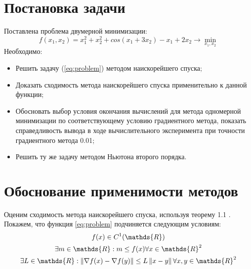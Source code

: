 \documentclass[main.tex]{subfiles}
\begin{document}
	
\section{Постановка задачи}
Поставлена проблема двумерной минимизации:
\begin{equation}\label{eq:problem}
f(x_1, x_2)=x_1^2+x_2^2+cos(x_1+3x_2)-x_1+2x_2 \rightarrow \min_{x_1, x_2}
\end{equation}
Необходимо:
\begin{itemize}
	\item Решить задачу (\ref{eq:problem}) методом наискорейшего спуска;
	\item Доказать сходимость метода наискорейшего спуска применительно к данной функции;
	\item Обосновать выбор условия окончания вычислений для метода одномерной минимизации по соответствующему условию градиентного метода, показать справедливость вывода в ходе вычислительного эксперимента при точности градиентного метода 0.01;
	\item Решить ту же задачу методом Ньютона второго порядка.
\end{itemize}

\section{Обоснование применимости методов}
Оценим сходимость метода наискорейшего спуска, используя теорему 1.1 \cite{boldirev}. Покажем, что функция \ref{eq:problem} подчиняется следующим условиям:\\
\begin{gather} %
\label{eq:convex} 
f(x) \in C^1(\mathds{R})\\
\label{eq:bounded}
\exists m \in \mathds{R}: m \le f(x) \forall x \in \mathds{R}^2 \\
\label{eq:lipshitz}
\exists L \in \mathds{R}: \norm{\nabla f(x) - \nabla f(y)} \le L\norm{x-y} \forall x,y \in \mathds{R}^2
\end{gather}
\end{document}
